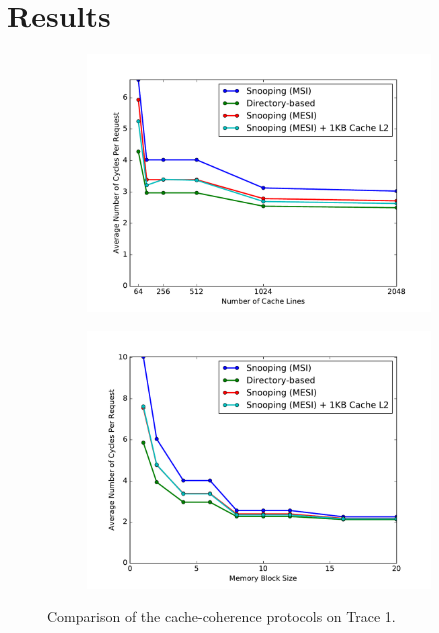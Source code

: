 \documentclass[12pt, a4paper, twoside]{article}
\begin{document}
\section{Results}

\begin{figure}[h]
\centering
\begin{subfigure}{0.48\textwidth}
\includegraphics[width=\textwidth]{figs/fig-1-1.pdf}
\end{subfigure}
\begin{subfigure}{0.48\textwidth}
\includegraphics[width=\textwidth]{figs/fig-1-2.pdf}
\end{subfigure}
\caption{Comparison of the cache-coherence protocols on Trace 1.}
\end{figure}
\end{document}
